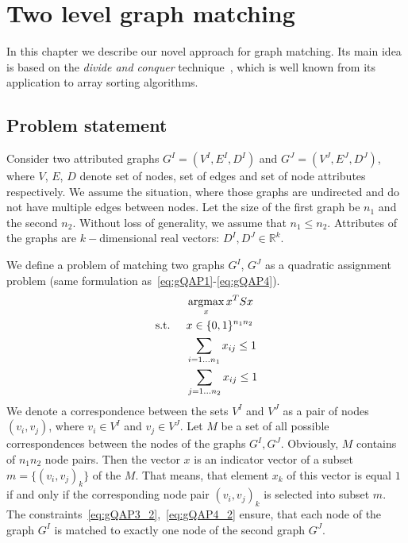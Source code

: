 \chapter{Two level graph matching} \label{chapter:2levelGM}
In this chapter we describe our novel approach for graph matching. Its main idea is based on the  \emph{divide and conquer} technique~\cite{Cormen}, which is well known from its application to array sorting algorithms.
\newpage
\section{Problem statement} \label{sec:prob_stat}
Consider two attributed graphs $G^I = (V^I, E^I, D^I)$ and $G^J = (V^J, E^J, D^J)$, where $V$, $E$, $D$ denote set of nodes, set of edges and set of node attributes respectively. We assume the situation, where those graphs are undirected and do not have multiple edges between nodes. Let the size of the first graph be $n_1$ and the second $n_2$. Without loss of generality, we assume that $n_1\le n_2$. Attributes of the graphs are $k-$dimensional real vectors: $D^I,D^J\in\mathbb{R}^k$.

We define a problem of matching two graphs $G^I$, $G^J$ as a quadratic assignment problem (same formulation as~\eqref{eq:gQAP1}-\eqref{eq:gQAP4}). 
\begin{alignat}{2}
    &     && \mathop{\rm argmax}_x{x^TSx}                           \label{eq:gQAP1_2}\\
    & \text{s.t. } &&  x\in \{0,1\}^{n_1n_2}            \label{eq:gQAP2_2}\\
    &             &&  \sum_{i=1\dots n_1} x_{ij}\le 1   \label{eq:gQAP3_2}\\
    &             &&  \sum_{j=1\dots n_2} x_{ij}\le 1   \label{eq:gQAP4_2}
\end{alignat}
We denote a correspondence between the sets $V^I$ and $V^J$ as a pair of nodes $(v_i,v_j)$, where $v_i\in V^I$ and $v_j\in V^J$. Let $M$ be a set of all possible correspondences between the nodes of the graphs $G^I,G^J$. Obviously, $M$ contains of $n_1n_2$ node pairs.  Then the vector $x$ is an indicator vector of a subset $m=\{(v_i,v_j)_k\}$ of the $M$. That means, that element $x_k$ of this vector is equal $1$ if and only if the corresponding node pair $(v_i,v_j)_k$ is selected into subset $m$. The constraints~\eqref{eq:gQAP3_2},~\eqref{eq:gQAP4_2} ensure, that each node of the graph $G^I$ is matched to exactly one node of the second graph $G^J$.


